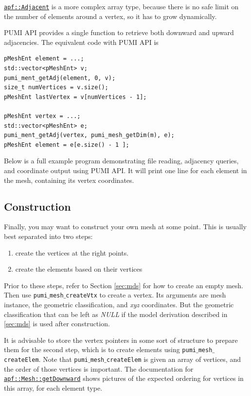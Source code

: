 \documentclass{article}
\begin{document}
{\href{http://scorec.rpi.edu/~dibanez/core/namespaceapf.html#a12d882b4789bf98322cbe6f02c91b1f8}{\texttt{apf::Adjacent}} is a more complex array type,
because there is no safe limit on the number of elements around
a vertex, so it has to grow dynamically.

PUMI API provides a single function to retrieve both downward and upward adjacencies.
The equivalent code with PUMI API is

\begin{lstlisting}
pMeshEnt element = ...;
std::vector<pMeshEnt> v;
pumi_ment_getAdj(element, 0, v);
size_t numVertices = v.size();
pMeshEnt lastVertex = v[numVertices - 1];

pMeshEnt vertex = ...;
std::vector<pMeshEnt> e;
pumi_ment_getAdj(vertex, pumi_mesh_getDim(m), e);
pMeshEnt element = e[e.size() - 1 ];
\end{lstlisting}

Below is a full example program demonstrating file reading,
adjacency queries, and coordinate output using PUMI API.
It will print one line for each element in the mesh,
containing its vertex coordinates.



\subsection{Construction}
\label{sec:gen}

Finally, you may want to construct your own mesh at
some point.
This is usually best separated into two steps:
\begin{enumerate}
\item create the vertices at the right points.
\item create the elements based on their vertices
\end{enumerate}

Prior to these steps, refer to Section \ref{sec:mds} for
how to create an empty mesh.
Then use \texttt{pumi$\_$mesh$\_$createVtx} to create a vertex.
Its arguments are mesh instance, the geometric classification, and \emph{xyz} coordinates. But the geometric classification that can be left as \emph{NULL} if the model derivation described
in \ref{sec:mds} is used after construction.

It is advisable to store the vertex pointers in some sort
of structure to prepare them for the second step,
which is to create elements using \texttt{pumi$\_$mesh$\_$createElem}.
Note that \texttt{pumi$\_$mesh$\_$createElem} is given an array
of vertices, and the order of those vertices is important.
The documentation for
\href{http://scorec.rpi.edu/~dibanez/core/classapf_1_1Mesh.html#ae9af2075129ffd4553092049d85b276b}{\texttt{apf::Mesh::getDownward}}
shows pictures of the expected ordering for vertices
in this array, for each element type.

}
\end{document}
